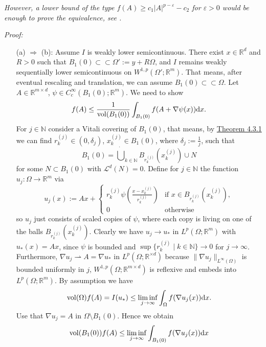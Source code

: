 \textit{However, a lower bound of the type $f(A)\geq c_1\lvert A\rvert^{p-\varepsilon}-c_2$ for $\varepsilon>0$ would be enough to prove the equivalence, see \cite[Part II, Chapter 8, Section 8.2 Weak lower semicontinuity, 8.2.4 Lower semicontinuity for general quasiconvex functions for $1\leq p<\infty$]{Daco2007DMCV}.}

\textit{Proof:}
\begin{itemize}
	\item[(a)] $\Rightarrow$ (b): Assume $I$ is weakly lower semicontinuous. There exist $x\in\mathbb{R}^d$ and $R>0$ such that $B_1(0)\subset\mathrel\subset\Omega':=y+R\Omega$, and $I$ remains weakly sequentially lower semicontinuous on $W^{1,p}(\Omega';\mathbb{R}^m)$. That means, after eventual rescaling and translation, we can assume $B_1(0)\subset\mathrel\subset\Omega$. Let $A\in\mathbb{R}^{m\times d}$, $\psi\in C_c^\infty(B_1(0);\mathbb{R}^m)$. We need to show
	\[f(A)\leq\frac{1}{\operatorname{vol}\mathopen{}\left(B_1(0)\right)\mathclose{}}\int_{B_1(0)}{f(A+\nabla\psi(x))\mathrm{d}x}.\]
	For $j\in\mathbb{N}$ consider a Vitali covering of $B_1(0)$, that means, by \hyperlink{theorem_4_3_1}{Theorem 4.3.1} we can find $r_k^{(j)}\in(0,\delta_j)$, $x_k^{(j)}\in B_1(0)$, where $\delta_j:=\frac{1}{j}$, such that
	\[B_1(0)=\dot\bigcup_{k\in\mathbb{N}}{B_{r_k^{(j)}}(x_k^{(j)})}\cup N\]
	for some $N\subset B_1(0)$ with $\mathcal{L}^d(N)=0$. Define for $j\in\mathbb{N}$ the function $u_j:\Omega\longrightarrow\mathbb{R}^m$ via
	\[u_j(x):=Ax+\left\{\begin{array}{rl}
		r_k^{(j)}\psi\left(\frac{x-x_k^{(j)}}{r_k^{(j)}}\right)&\text{if }x\in B_{r_k^{(j)}}(x_k^{(j)}),\\
		0&\text{otherwise}
	\end{array}\right.\]
	so $u_j$ just consists of scaled copies of $\psi$, where each copy is living on one of the balls $B_{r_k^{(j)}}(x_k^{(j)})$. Clearly we have $u_j\to u_*$ in $L^p(\Omega;\mathbb{R}^m)$ with $u_*(x)=Ax$, since $\psi$ is bounded and $\sup\{r_k^{(j)}\mid k\in\mathbb{N}\}\to0$ for $j\to\infty$. Furthermore, $\nabla u_j\rightharpoonup A=\nabla u_*$ in $L^p(\Omega;\mathbb{R}^{\times d})$ because $\rVert\nabla u_j\rVert_{L^\infty(\Omega)}$ is bounded uniformly in $j$, $W^{1,p}(\Omega;\mathbb{R}^{m\times d})$ is reflexive and embeds into $L^p(\Omega;\mathbb{R}^m)$. By assumption we have
	\[\operatorname{vol}\mathopen{}\left(\Omega\right)\mathclose{}f(A)=I(u_*)\leq\liminf_{j\to\infty}{\int_\Omega{f(\nabla u_j(x))\mathrm{d}x}}.\]
	Use that $\nabla u_j=A$ in $\Omega\setminus B_1(0)$. Hence we obtain
	\begin{align*}
		\vol{B_1(0)}f(A)&\leq\liminf_{j\to\infty}{\int_{B_1(0)}{f(\nabla u_j(x))\mathrm{d}x}}\\

\end{align*}
\end{itemize}

